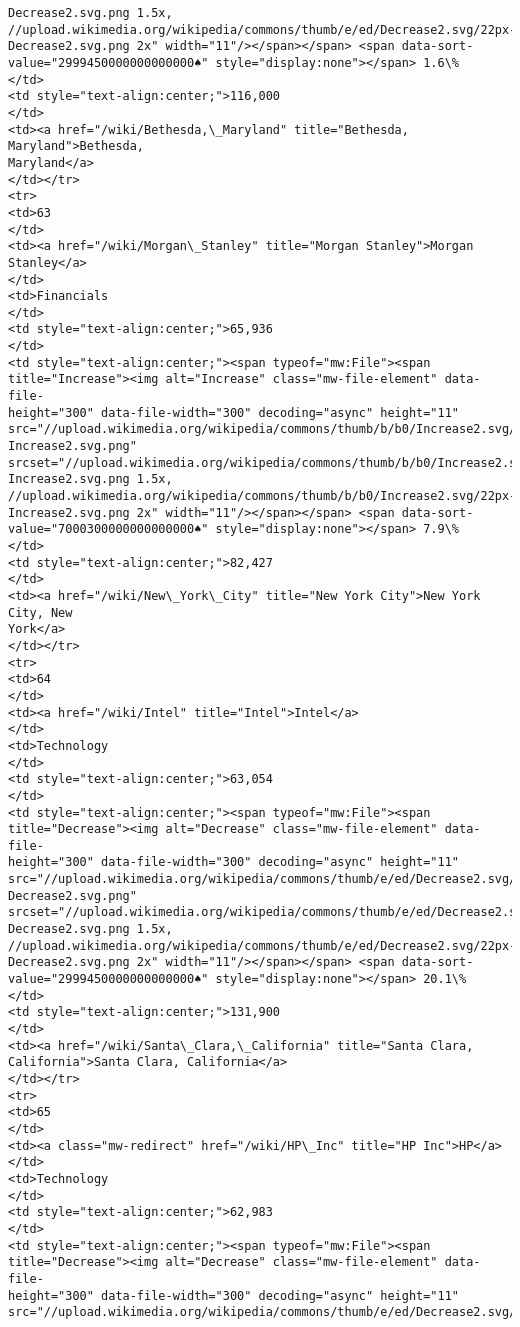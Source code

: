 \documentclass[11pt]{article}
\begin{document}
\begin{Verbatim}[commandchars=\\\{\}]
Decrease2.svg.png 1.5x,
//upload.wikimedia.org/wikipedia/commons/thumb/e/ed/Decrease2.svg/22px-
Decrease2.svg.png 2x" width="11"/></span></span> <span data-sort-
value="2999450000000000000♠" style="display:none"></span> 1.6\%
</td>
<td style="text-align:center;">116,000
</td>
<td><a href="/wiki/Bethesda,\_Maryland" title="Bethesda, Maryland">Bethesda,
Maryland</a>
</td></tr>
<tr>
<td>63
</td>
<td><a href="/wiki/Morgan\_Stanley" title="Morgan Stanley">Morgan Stanley</a>
</td>
<td>Financials
</td>
<td style="text-align:center;">65,936
</td>
<td style="text-align:center;"><span typeof="mw:File"><span
title="Increase"><img alt="Increase" class="mw-file-element" data-file-
height="300" data-file-width="300" decoding="async" height="11"
src="//upload.wikimedia.org/wikipedia/commons/thumb/b/b0/Increase2.svg/11px-
Increase2.svg.png"
srcset="//upload.wikimedia.org/wikipedia/commons/thumb/b/b0/Increase2.svg/17px-
Increase2.svg.png 1.5x,
//upload.wikimedia.org/wikipedia/commons/thumb/b/b0/Increase2.svg/22px-
Increase2.svg.png 2x" width="11"/></span></span> <span data-sort-
value="7000300000000000000♠" style="display:none"></span> 7.9\%
</td>
<td style="text-align:center;">82,427
</td>
<td><a href="/wiki/New\_York\_City" title="New York City">New York City, New
York</a>
</td></tr>
<tr>
<td>64
</td>
<td><a href="/wiki/Intel" title="Intel">Intel</a>
</td>
<td>Technology
</td>
<td style="text-align:center;">63,054
</td>
<td style="text-align:center;"><span typeof="mw:File"><span
title="Decrease"><img alt="Decrease" class="mw-file-element" data-file-
height="300" data-file-width="300" decoding="async" height="11"
src="//upload.wikimedia.org/wikipedia/commons/thumb/e/ed/Decrease2.svg/11px-
Decrease2.svg.png"
srcset="//upload.wikimedia.org/wikipedia/commons/thumb/e/ed/Decrease2.svg/17px-
Decrease2.svg.png 1.5x,
//upload.wikimedia.org/wikipedia/commons/thumb/e/ed/Decrease2.svg/22px-
Decrease2.svg.png 2x" width="11"/></span></span> <span data-sort-
value="2999450000000000000♠" style="display:none"></span> 20.1\%
</td>
<td style="text-align:center;">131,900
</td>
<td><a href="/wiki/Santa\_Clara,\_California" title="Santa Clara,
California">Santa Clara, California</a>
</td></tr>
<tr>
<td>65
</td>
<td><a class="mw-redirect" href="/wiki/HP\_Inc" title="HP Inc">HP</a>
</td>
<td>Technology
</td>
<td style="text-align:center;">62,983
</td>
<td style="text-align:center;"><span typeof="mw:File"><span
title="Decrease"><img alt="Decrease" class="mw-file-element" data-file-
height="300" data-file-width="300" decoding="async" height="11"
src="//upload.wikimedia.org/wikipedia/commons/thumb/e/ed/Decrease2.svg/11px-

\end{Verbatim}
\end{document}
